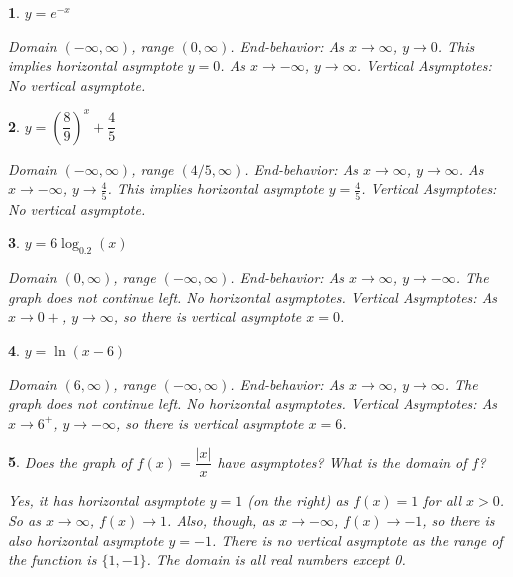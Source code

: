 \documentclass{amsbook}
\newtheorem{exc}{}
\newenvironment{ex}{\begin{exc}\normalfont}{\end{exc}}
\numberwithin{section}{chapter}
\numberwithin{equation}{chapter}
\begin{document}
\begin{multicols}{2}
	\begin{ex}
	$y= e^{-x}$
	\begin{sol}
				Domain $(-\infty, \infty)$, range $(0, \infty)$.
		End-behavior: As $x\to\infty$, $y\to0$. This implies horizontal asymptote $y=0$. As $x\to-\infty$, $y\to\infty$.
		Vertical Asymptotes: No vertical asymptote.
	\end{sol}
\end{ex}
	\begin{ex}
	$y= \left( \dfrac{8}{9} \right)^{x}+\dfrac{4}{5}$
	\begin{sol}
		Domain $(-\infty, \infty)$, range $(4/5, \infty)$.
		End-behavior: As $x\to\infty$, $y\to\infty$. As $x\to-\infty$, $y\to\frac{4}{5}$. This implies horizontal asymptote $y=\frac{4}{5}$.
		Vertical Asymptotes: No vertical asymptote.
	\end{sol}
\end{ex}
	\begin{ex}
	$y= 6\log_{0.2}(x)$
	\begin{sol}
		Domain $(0, \infty)$, range $(-\infty, \infty)$.
		End-behavior: As $x\to\infty$, $y\to-\infty$. The graph does not continue left. No horizontal asymptotes.
		Vertical Asymptotes: As $x\to0+$, $y\to\infty$, so there is vertical asymptote $x=0$.
	\end{sol}
\end{ex}
	\begin{ex}
	$y= \ln(x-6)$
	\begin{sol}
			Domain $(6, \infty)$, range $(-\infty, \infty)$.
		End-behavior: As $x\to\infty$, $y\to\infty$. The graph does not continue left. No horizontal asymptotes.
		Vertical Asymptotes: As $x\to6^+$, $y\to-\infty$, so there is vertical asymptote $x=6$.
	\end{sol}
\end{ex}

\end{multicols}

\begin{ex}
	Does the graph of $f(x)=\dfrac{|x|}{x}$ have asymptotes? What is the domain of $f$?
	
	\begin{sol}
		Yes, it has horizontal asymptote $y=1$ (on the right) as $f(x)=1$ for all $x>0$. So as $x\to\infty$, $f(x) \to 1$. Also, though, as $x\to-\infty$, $f(x) \to -1$, so there is also horizontal asymptote $y=-1$. There is no vertical asymptote as the range of the function is $\{1,-1\}$. The domain is all real numbers except 0.
	\end{sol}
\end{ex}
\end{document}
